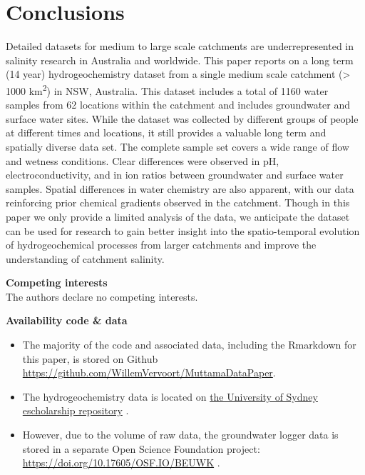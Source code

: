 \documentclass[, manuscript]{copernicus}
\providecommand{\tightlist}{%
  \setlength{\itemsep}{0pt}\setlength{\parskip}{0pt}}
\begin{document}
\section{Conclusions}

Detailed datasets for medium to large scale catchments are
underrepresented in salinity research in Australia and worldwide. This
paper reports on a long term (14 year) hydrogeochemistry dataset from a
single medium scale catchment (\textgreater{} 1000
km\textsuperscript{2}) in NSW, Australia. This dataset includes a total
of 1160 water samples from 62 locations within the catchment and
includes groundwater and surface water sites. While the dataset was
collected by different groups of people at different times and
locations, it still provides a valuable long term and spatially diverse
data set. The complete sample set covers a wide range of flow and
wetness conditions. Clear differences were observed in pH,
electroconductivity, and in ion ratios between groundwater and surface
water samples. Spatial differences in water chemistry are also apparent,
with our data reinforcing prior chemical gradients observed in the
catchment. Though in this paper we only provide a limited analysis of
the data, we anticipate the dataset can be used for research to gain
better insight into the spatio-temporal evolution of hydrogeochemical
processes from larger catchments and improve the understanding of
catchment salinity.

\bigskip

\noindent \textbf{Competing interests}\\
The authors declare no competing interests.

\bigskip

\noindent \textbf{Availability code \& data}

\begin{itemize}
\tightlist
\item
  The majority of the code and associated data, including the Rmarkdown
  for this paper, is stored on Github
  \url{https://github.com/WillemVervoort/MuttamaDataPaper}.\\
\item
  The hydrogeochemistry data is located on
  \href{doi.org/10.25910/m0wp-8890}{the University of Sydney
  escholarship repository} \citet{vervoort2025}.\\
\item
  However, due to the volume of raw data, the groundwater logger data is
  stored in a separate Open Science Foundation project:
  \url{https://doi.org/10.17605/OSF.IO/BEUWK} \citet{vervoort2024}.
\end{itemize}
\end{document}
